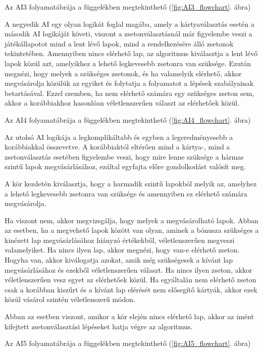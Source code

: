Az AI3 folyamatábrája a függelékben megtekinthető (\ref{fig:AI3_flowchart}. ábra)



A negyedik AI egy olyan logikát foglal magába, amely a kártyaválasztás esetén a második AI logikáját követi, viszont a zsetonválasztásnál már figyelembe veszi a játékállapotot mind a lent lévő lapok, mind a rendelkezésére álló zsetonok tekintetében. Amennyiben nincs elérhető lap, az algoritmus kiválasztja a lent lévő lapok közül azt, amelyikhez a lehető legkevesebb zsetonra van szüksége. Ezután megnézi, hogy melyek a szükséges zsetonok, és ha valamelyik elérhető, akkor megvásárolja közülük az egyiket és folytatja a folyamatot a lépések szabályainak betartásával. Ezzel szemben, ha nem elérhető számára egy szükséges zseton sem, akkor a korábbiakhoz hasonlóan véletlenszerűen választ az elérhetőek közül.

Az AI4 folyamatábrája a függelékben megtekinthető (\ref{fig:AI4_flowchart}. ábra)


Az utolsó AI logikája a legkomplikáltabb és egyben a legeredményesebb a korábbiakkal összevetve. A korábbiaktól eltérően mind a kártya-, mind a zsetonválasztás esetében figyelembe veszi, hogy mire lenne szüksége a hármas szintű lapok megvásárlásához, ezáltal egyfajta előre gondolkodást valósít meg.

A kör kezdetén kiválasztja, hogy a harmadik szintű lapokból melyik az, amelyhez a lehető legkevesebb zsetonra van szüksége és amennyiben ez elérhető számára megvásárolja.

Ha viszont nem, akkor megvizsgálja, hogy melyek a megvásárolható lapok. Abban az esetben, ha a megvehető lapok között van olyan, aminek a bónusza szükséges a kinézett lap megvásárlásához hiányzó értékekből, véletlenszerűen megveszi valamelyiket. Ha nincs ilyen lap, akkor megnézi, hogy van-e elérhető zseton. Hogyha van, akkor kiválogatja azokat, amik még szükségesek a kívánt lap megvásárlásához és ezekből véletlenszerűen választ. Ha nincs ilyen zseton, akkor véletlenszerűen vesz egyet az elérhetőek közül. Ha egyáltalán nem elérhető zseton csak a korábban kiszűrt és a kívánt lap elérését nem elősegítő kártyák, akkor ezek közül vásárol szintén véletlenszerű módon.

Abban az esetben viszont, amikor a kör elején nincs elérhető lap, akkor az imént kifejtett zsetonválasztási lépéseket hatja végre az algoritmus.

Az AI5 folyamatábrája a függelékben megtekinthető (\ref{fig:AI5_flowchart}. ábra)


